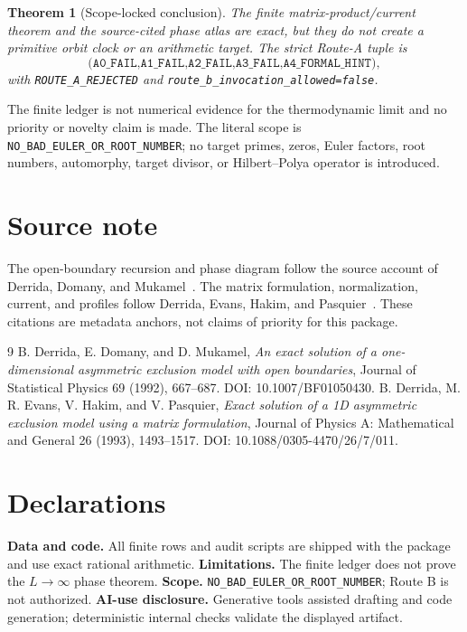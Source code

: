 \documentclass[11pt]{article}
\newtheorem{theorem}{Theorem}
\begin{document}
\begin{theorem}[Scope-locked conclusion]
The finite matrix-product/current theorem and the source-cited phase atlas
are exact, but they do not create a primitive orbit clock or an arithmetic
target.  The strict Route-A tuple is
\[
\texttt{(A0\_FAIL,A1\_FAIL,A2\_FAIL,A3\_FAIL,A4\_FORMAL\_HINT)},
\]
with \texttt{ROUTE\_A\_REJECTED} and
\texttt{route\_b\_invocation\_allowed=false}.
\end{theorem}
The finite ledger is not numerical evidence for the thermodynamic limit and
no priority or novelty claim is made.  The literal scope is
\texttt{NO\_BAD\_EULER\_OR\_ROOT\_NUMBER}; no target primes, zeros, Euler
factors, root numbers, automorphy, target divisor, or Hilbert--Polya operator
is introduced.
\fi

\section*{Source note}
The open-boundary recursion and phase diagram follow the source account of
Derrida, Domany, and Mukamel~\cite{DDM1992}.  The matrix formulation,
normalization, current, and profiles follow Derrida, Evans, Hakim, and
Pasquier~\cite{DEHP1993}.  These citations are metadata anchors, not claims
of priority for this package.

\begin{thebibliography}{9}
B. Derrida, E. Domany, and D. Mukamel,
\textit{An exact solution of a one-dimensional asymmetric exclusion model
with open boundaries}, Journal of Statistical Physics 69 (1992), 667--687.
DOI: 10.1007/BF01050430.
B. Derrida, M. R. Evans, V. Hakim, and V. Pasquier,
\textit{Exact solution of a 1D asymmetric exclusion model using a matrix
formulation}, Journal of Physics A: Mathematical and General 26 (1993),
1493--1517. DOI: 10.1088/0305-4470/26/7/011.
\end{thebibliography}

\section*{Declarations}
\textbf{Data and code.} All finite rows and audit scripts are shipped with
the package and use exact rational arithmetic.  \textbf{Limitations.} The
finite ledger does not prove the $L\to\infty$ phase theorem.  \textbf{Scope.}
\texttt{NO\_BAD\_EULER\_OR\_ROOT\_NUMBER}; Route B is not authorized.
\textbf{AI-use disclosure.} Generative tools assisted drafting and code
generation; deterministic internal checks validate the displayed artifact.
\end{document}
